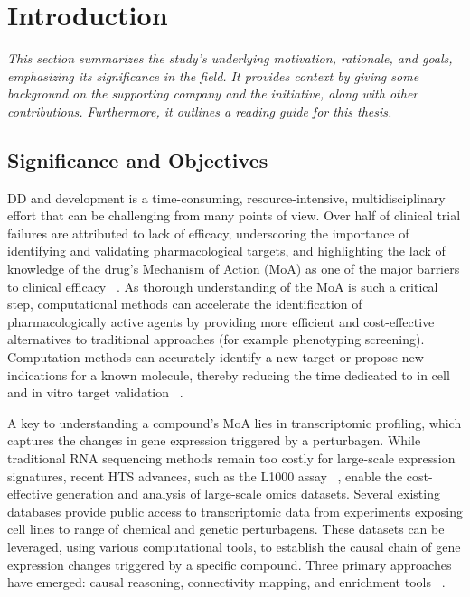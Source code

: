 
%

\makeatletter
\newcommand{\ntifpkgloaded}{%
  \@ifpackageloaded%
}
\makeatother

\chapter{Introduction}
\label{cha:introduction}

\textit{This section summarizes the study's underlying motivation, rationale, and goals, emphasizing its significance in the field. It provides context by giving some background on the supporting company and the initiative, along with other contributions. Furthermore, it outlines a reading guide for this thesis.}

\section{Significance and Objectives} %
\label{sec:significance_and_objectives}


\gls{DD} and development is a time-consuming, resource-intensive, multidisciplinary effort that can be challenging from many points of view. 
Over half of clinical trial failures are attributed to lack of efficacy, underscoring the importance of identifying and validating pharmacological targets, and highlighting the lack of knowledge of the drug's \gls{Mechanism of Action (MoA)} as one of the major barriers to clinical efficacy ~\cite{RN1, RN2, RN3}. 
As thorough understanding of the \gls{MoA} is such a critical step, computational methods can accelerate the identification of pharmacologically active agents by providing more efficient and cost-effective alternatives to traditional approaches (for example phenotyping screening). 
Computation methods can accurately identify a new target or propose new indications for a known molecule, thereby reducing the time dedicated to in cell and in vitro target validation ~\cite{RN29}.

A key to understanding a compound's \gls{MoA} lies in transcriptomic profiling, which captures the changes in gene expression triggered by a perturbagen. 
While traditional RNA sequencing methods remain too costly for large-scale expression signatures, recent \gls{HTS} advances, such as the L1000 assay ~\cite{RN30}, enable the cost-effective generation and analysis of large-scale omics datasets. 
Several existing databases provide public access to transcriptomic data from experiments exposing cell lines to range of chemical and genetic perturbagens. 
These datasets can be leveraged, using various computational tools, to establish the causal chain of gene expression changes triggered by a specific compound. 
Three primary approaches have emerged: causal reasoning, connectivity mapping, and enrichment tools ~\cite{RN38}.

